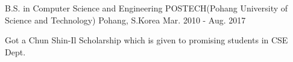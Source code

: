 
\begin{cventries}

  \cventry
  {B.S. in Computer Science and Engineering} %
  {POSTECH(Pohang University of Science and Technology)} %
  {Pohang, S.Korea} %
  {Mar. 2010 - Aug. 2017} %
  {
    \begin{cvitems} %
    \item {Got a Chun Shin-Il Scholarship which is given to promising students in CSE Dept.}
    \end{cvitems}
  }

\end{cventries}
